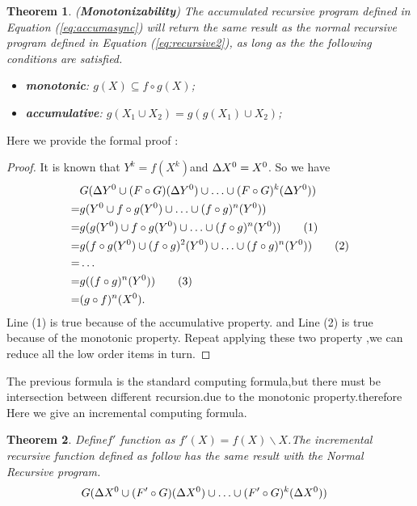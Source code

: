 \documentclass{vldb}
\newtheorem{theorem}{Theorem}
\begin{document}
\begin{theorem}
	\label{th:monotone}
	(\textbf{Monotonizability}) The accumulated recursive program defined in Equation (\ref{eq:accumasync}) will return the same result as the normal recursive program defined in Equation (\ref{eq:recursive2}), as long as the the following conditions are satisfied.
	\begin{itemize}
		\item \textbf{monotonic}: $g(X)\subseteq f\circ g(X)$;
		\item \textbf{accumulative}: $g(X_1\cup X_2)=g(g(X_1)\cup X_2)$;
	\end{itemize}
\end{theorem}
Here we provide the formal proof :
 \begin{proof}
  It is known that $Y^k=f(X^k)$and $\Delta X^0=X^0\\$. So we have
 \begin{align}
 &G(\Delta Y^0\cup (F\circ G)(\Delta Y^0)\cup\ldots\cup (F\circ G)^k(\Delta Y^0))\notag \\
 =&g(Y^0\cup f\circ g(Y^0)\cup \ldots \cup (f\circ g)^n(Y^0))    \notag\\
 =&g(g(Y^0)\cup f\circ g(Y^0)\cup \ldots \cup (f\circ g)^n(Y^0))  \tag{1}\\
 =&g(f\circ g(Y^0)\cup (f\circ g)^2(Y^0)\cup \ldots \cup (f\circ g)^n(Y^0)) \tag{2}\\
 =& \ldots \notag \\
 =&g((f\circ g)^n(Y^0))\tag{3}\\
 =&(g \circ f)^n(X^0).\notag
 \end{align}
  Line (1) is true because of the accumulative property. and Line (2) is true because of the monotonic property.
  Repeat applying these two property ,we can reduce all the low order items in turn.
 \end{proof}
{\color{red} The previous formula is the standard computing formula,but there must be intersection between different recursion.due to the monotonic property.therefore Here we give an incremental computing formula.}
	\begin{theorem}
		Define$f'$ function as $f'(X)=f(X)\backslash X$.The incremental recursive function defined as follow has the same result with the Normal Recursive program. 
	 \begin{align}
	 	&G(\Delta X^0\cup (F'\circ G)(\Delta X^0)\cup\ldots\cup (F'\circ G)^k(\Delta X^0))\notag 
	 \end{align}
	\end{theorem}
\end{document}
